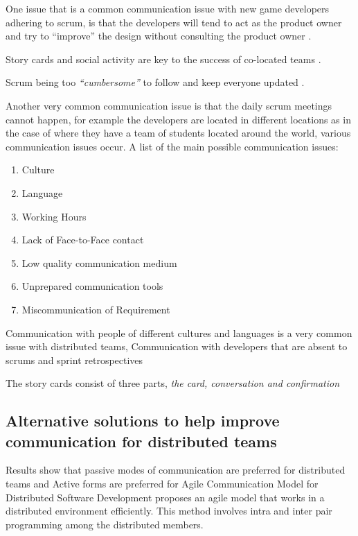 \documentclass{scrartcl}
\begin{document}
One issue that is a common communication issue with new game developers adhering to scrum, is that the developers will tend to act as the product owner and try to ``improve'' the design without consulting the product owner \cite{krasteva2008}. 

Story cards and social activity are key to the success of co-located teams \cite{abdullah2011}. 

Scrum being too \textit{``cumbersome''} to follow and keep everyone updated \cite{scharff2012}.


Another very common communication issue is that the daily scrum meetings cannot happen, for example the developers are located in different locations as in the case of \cite{scharff2012} where they have a team of students located around the world, various communication issues occur. A list of the main possible communication issues: \cite{joshi2013}


\begin{enumerate}
\item Culture
\item Language
\item Working Hours
\item Lack of Face-to-Face contact
\item Low quality communication medium
\item Unprepared communication tools
\item Miscommunication of Requirement
\end{enumerate}

Communication with people of different cultures and languages is a very common issue with distributed teams, \cite{cohn2003}
Communication with developers that are absent to scrums and sprint retrospectives \cite{scharff2012}

The story cards consist of three parts, \textit{the card, conversation and confirmation} \cite{abdullah2011}


\subsection{Alternative solutions to help improve communication for distributed teams}

Results show that passive modes of communication are preferred for distributed teams and Active forms are preferred for 
Agile Communication Model for Distributed Software Development \cite{bhalerao2010} proposes an agile model that works in a distributed environment efficiently. This method involves intra and inter pair programming among the distributed members.
\end{document}
